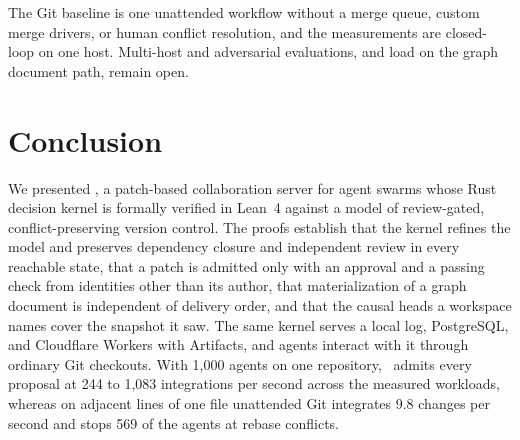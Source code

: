 The Git baseline is one unattended workflow without a merge queue, custom merge drivers, or human conflict resolution, and the measurements are closed-loop on one host. Multi-host and adversarial evaluations, and load on the graph document path, remain open.

\section{Conclusion}
We presented \sys, a patch-based collaboration server for agent swarms whose Rust decision kernel is formally verified in Lean~4 against a model of review-gated, conflict-preserving version control. The proofs establish that the kernel refines the model and preserves dependency closure and independent review in every reachable state, that a patch is admitted only with an approval and a passing check from identities other than its author, that materialization of a graph document is independent of delivery order, and that the causal heads a workspace names cover the snapshot it saw. The same kernel serves a local log, PostgreSQL, and Cloudflare Workers with Artifacts, and agents interact with it through ordinary Git checkouts. With 1,000 agents on one repository, \sys\ admits every proposal at 244 to 1,083 integrations per second across the measured workloads, whereas on adjacent lines of one file unattended Git integrates 9.8 changes per second and stops 569 of the agents at rebase conflicts.




